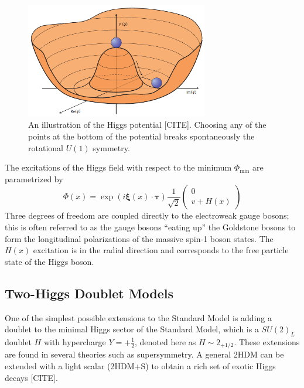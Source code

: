 \documentclass{article}
\begin{document}
\begin{figure}[ht]
    \centering
    \includegraphics[width=8cm]{figures/higgs-potential.png}
    \caption{An illustration of the Higgs potential [CITE]. Choosing any of the points at the bottom of the potential breaks spontaneously the rotational $U(1)$ symmetry.}
    \label{fig:higgs-potential}
\end{figure}

The excitations of the Higgs field with respect to the minimum $\Phi_{\text{min}}$ are parametrized by 
\begin{equation}
    \Phi(x) = \exp(i \boldsymbol{\xi}(x) \cdot \boldsymbol{\tau}) \frac{1}{\sqrt{2}} \begin{pmatrix} 0 \\ v + H(x) \end{pmatrix}
\end{equation}
Three degrees of freedom are coupled directly to the electroweak gauge bosons; this is often referred to as the gauge bosons ``eating up'' the Goldstone bosons to form the longitudinal polarizations of the massive spin-1 boson states. The $H(x)$ excitation is in the radial direction and corresponds to the free particle state of the Higgs boson. 

\subsection{Two-Higgs Doublet Models}


One of the simplest possible extensions to the Standard Model is adding a doublet to the minimal Higgs sector of the Standard Model, which is a $SU(2)_L$ doublet $H$ with hypercharge $Y = +\frac{1}{2}$, denoted here as $H \sim 2_{+1/2}$. These extensions are found in several theories such as supersymmetry. A general 2HDM can be extended with a light scalar (2HDM+S) to obtain a rich set of exotic Higgs decays [CITE]. 
\end{document}
